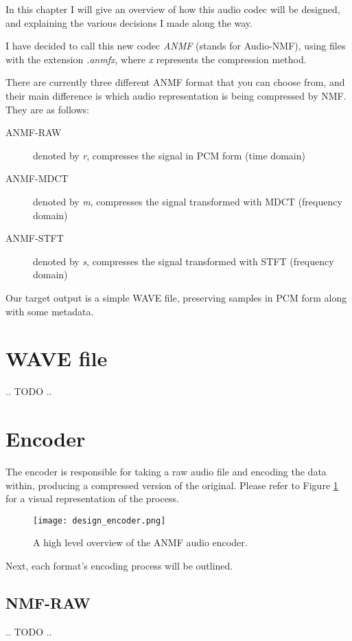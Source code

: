 In this chapter I will give an overview of how this audio codec will be designed, and explaining the various decisions I made along the way.

I have decided to call this new codec \emph{ANMF} (stands for Audio-NMF), using files with the extension \emph{.anmfx}, where \emph{x} represents the compression method.

There are currently three different ANMF format that you can choose from, and their main difference is which audio representation is being compressed by NMF. They are as follows:

\begin{description}
	\item[ANMF-RAW] denoted by \emph{r}, compresses the signal in PCM form (time domain)
	\item[ANMF-MDCT] denoted by \emph{m}, compresses the signal transformed with MDCT (frequency domain)
	\item[ANMF-STFT] denoted by \emph{s}, compresses the signal transformed with STFT (frequency domain)
\end{description}

Our target output is a simple WAVE file, preserving samples in PCM form along with some metadata.

\section{WAVE file}
.. TODO ..

\section{Encoder}
The encoder is responsible for taking a raw audio file and encoding the data within, producing a compressed version of the original. Please refer to Figure \ref{fig:design_encoder} for a visual representation of the process.

\begin{figure}[ht]
	\label{fig:design_encoder}
	\caption[Encoder overview]{A high level overview of the ANMF audio encoder.}
	\centering
	\texttt{[image: design\_encoder.png]}
\end{figure}

Next, each format's encoding process will be outlined.

\subsection{NMF-RAW}
.. TODO ..

